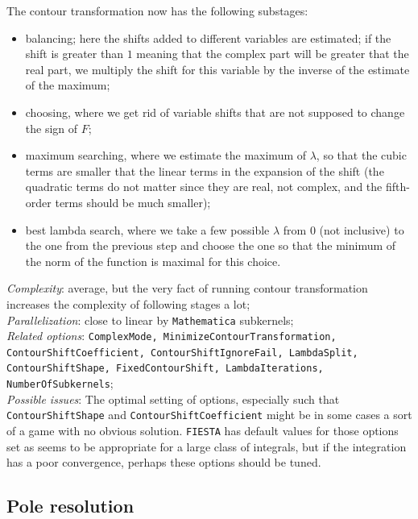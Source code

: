 \documentclass[preprint,12pt]{elsarticle}
\begin{document}
The contour transformation now has the following substages:
\begin{itemize}
 \item balancing; here the shifts added to different variables are estimated; if the shift is greater than $1$ meaning that the complex part will be greater that the real part, we multiply the shift for this variable by the inverse of the estimate of the maximum;
 \item choosing, where we get rid of variable shifts that are not supposed to change the sign of $F$;
 \item maximum searching, where we estimate the maximum of $\lambda$, so that the cubic terms are smaller that the linear terms in the expansion of the shift (the quadratic terms do not matter since they are real, not complex, and the fifth-order terms should be much smaller);
 \item best lambda search, where we take a few possible $\lambda$ from 0 (not inclusive) to the one from the previous step and choose the one so that the minimum of the norm of the function is maximal for this choice.
\end{itemize}


\textit{Complexity}: average, but the very fact of running contour transformation increases the complexity of following stages a lot;\\\indent 
\textit{Parallelization}: close to linear by {\tt Mathematica} subkernels;\\\indent
\textit{Related options}: {\tt ComplexMode, MinimizeContourTransformation, \\ ContourShiftCoefficient, ContourShiftIgnoreFail, LambdaSplit, \\ ContourShiftShape, FixedContourShift, LambdaIterations,\\ NumberOfSubkernels};\\\indent
\textit{Possible issues}: The optimal setting of options, especially such that {\tt ContourShiftShape} and {\tt ContourShiftCoefficient} might be in some cases a sort of a game with no obvious solution. {\tt FIESTA} has default values for those options set as seems to be appropriate for a large class of integrals, but if the integration has a poor convergence, perhaps these options should be tuned.

\subsection{Pole resolution}
\end{document}
